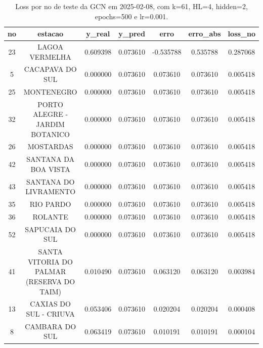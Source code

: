 \begin{table}[h]
\centering
\caption{Loss por no de teste da GCN em 2025-02-08, com k=61, HL=4, hidden=2, epochs=500 e lr=0.001.}
\label{tab:gcn_loss_k61_hl4_h2_e500_d20250208}
\begin{tabular}{ccccccc}
\toprule
no & estacao & y\_real & y\_pred & erro & erro\_abs & loss\_no \\
\midrule
23 & LAGOA VERMELHA & 0.609398 & 0.073610 & -0.535788 & 0.535788 & 0.287068 \\
5 & CACAPAVA DO SUL & 0.000000 & 0.073610 & 0.073610 & 0.073610 & 0.005418 \\
25 & MONTENEGRO & 0.000000 & 0.073610 & 0.073610 & 0.073610 & 0.005418 \\
32 & PORTO ALEGRE - JARDIM BOTANICO & 0.000000 & 0.073610 & 0.073610 & 0.073610 & 0.005418 \\
26 & MOSTARDAS & 0.000000 & 0.073610 & 0.073610 & 0.073610 & 0.005418 \\
42 & SANTANA DA BOA VISTA & 0.000000 & 0.073610 & 0.073610 & 0.073610 & 0.005418 \\
43 & SANTANA DO LIVRAMENTO & 0.000000 & 0.073610 & 0.073610 & 0.073610 & 0.005418 \\
35 & RIO PARDO & 0.000000 & 0.073610 & 0.073610 & 0.073610 & 0.005418 \\
36 & ROLANTE & 0.000000 & 0.073610 & 0.073610 & 0.073610 & 0.005418 \\
52 & SAPUCAIA DO SUL & 0.000000 & 0.073610 & 0.073610 & 0.073610 & 0.005418 \\
41 & SANTA VITORIA DO PALMAR (RESERVA DO TAIM) & 0.010490 & 0.073610 & 0.063120 & 0.063120 & 0.003984 \\
13 & CAXIAS DO SUL - CRIUVA & 0.053406 & 0.073610 & 0.020204 & 0.020204 & 0.000408 \\
8 & CAMBARA DO SUL & 0.063419 & 0.073610 & 0.010191 & 0.010191 & 0.000104 \\
\bottomrule
\end{tabular}
\end{table}
